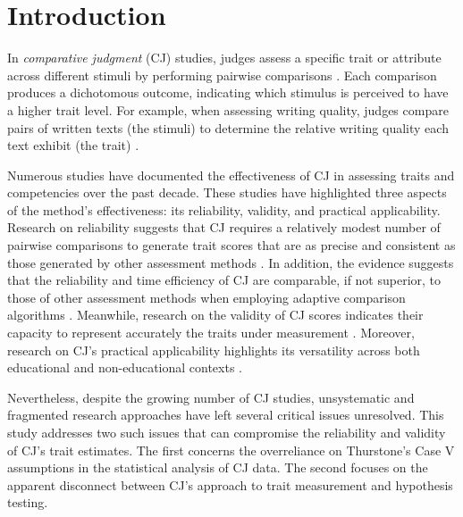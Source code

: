 \documentclass[
  authoryear,
  review,
  1p]{elsarticle}
\begin{document}
\newcommand{\dsep}{\:\bot\:}
\newcommand{\ndsep}{\:\not\bot\:}
\newcommand{\cond}{\:|\:}

\section{Introduction}\label{sec-introduction}

In \emph{comparative judgment} (CJ) studies, judges assess a specific
trait or attribute across different stimuli by performing pairwise
comparisons \citep{Thurstone_1927a, Thurstone_1927b}. Each comparison
produces a dichotomous outcome, indicating which stimulus is perceived
to have a higher trait level. For example, when assessing writing
quality, judges compare pairs of written texts (the stimuli) to
determine the relative writing quality each text exhibit (the trait)
\citep{Laming_2004, Pollitt_2012b, Whitehouse_2012, vanDaal_et_al_2016, Lesterhuis_2018_thesis, Coertjens_et_al_2017, Goossens_et_al_2018, Bouwer_et_al_2023}.

Numerous studies have documented the effectiveness of CJ in assessing
traits and competencies over the past decade. These studies have
highlighted three aspects of the method's effectiveness: its
reliability, validity, and practical applicability. Research on
reliability suggests that CJ requires a relatively modest number of
pairwise comparisons \citep{Verhavert_et_al_2019, Crompvoets_et_al_2022}
to generate trait scores that are as precise and consistent as those
generated by other assessment methods
\citep{Coertjens_et_al_2017, Goossens_et_al_2018, Bouwer_et_al_2023}. In
addition, the evidence suggests that the reliability and time efficiency
of CJ are comparable, if not superior, to those of other assessment
methods when employing adaptive comparison algorithms
\citep{Pollitt_2012b, Verhavert_et_al_2022, Mikhailiuk_et_al_2021}.
Meanwhile, research on the validity of CJ scores indicates their
capacity to represent accurately the traits under measurement
\citep{Whitehouse_2012, vanDaal_et_al_2016, Lesterhuis_2018_thesis, Bartholomew_et_al_2018, Bouwer_et_al_2023}.
Moreover, research on CJ's practical applicability highlights its
versatility across both educational and non-educational contexts
\citep{Kimbell_2012, Jones_et_al_2015, Bartholomew_et_al_2018, Jones_et_al_2019, Marshall_et_al_2020, Bartholomew_et_al_2020, Boonen_et_al_2020}.

Nevertheless, despite the growing number of CJ studies, unsystematic and
fragmented research approaches have left several critical issues
unresolved. This study addresses two such issues that can compromise the
reliability and validity of CJ's trait estimates. The first concerns the
overreliance on Thurstone's Case V assumptions in the statistical
analysis of CJ data. The second focuses on the apparent disconnect
between CJ's approach to trait measurement and hypothesis testing.
\end{document}
